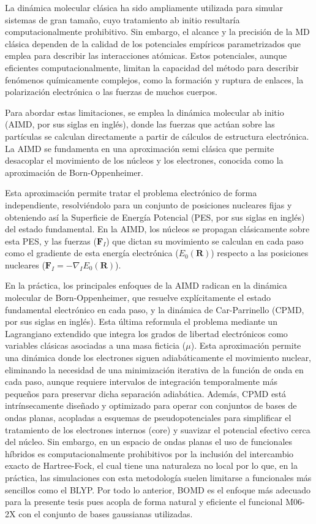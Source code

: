 La dinámica molecular clásica ha sido ampliamente utilizada para simular sistemas de gran tamaño, cuyo tratamiento ab initio resultaría computacionalmente prohibitivo. Sin embargo, el alcance y la precisión de la MD clásica dependen de la calidad de los potenciales empíricos parametrizados que emplea para describir las interacciones atómicas. Estos potenciales, aunque eficientes computacionalmente, limitan la capacidad del método para describir fenómenos químicamente complejos, como la formación y ruptura de enlaces, la polarización electrónica o las fuerzas de muchos cuerpos.

Para abordar estas limitaciones, se emplea la dinámica molecular ab initio (AIMD, por sus siglas en inglés), donde las fuerzas que actúan sobre las partículas se calculan directamente a partir de cálculos de estructura electrónica. La AIMD se fundamenta en una aproximación semi clásica que permite desacoplar el movimiento de los núcleos y los electrones, conocida como la aproximación de Born-Oppenheimer.

Esta aproximación permite tratar el problema electrónico de forma independiente, resolviéndolo para un conjunto de posiciones nucleares fijas y obteniendo así la Superficie de Energía Potencial (PES, por sus siglas en inglés) del estado fundamental. En la AIMD, los núcleos se propagan clásicamente sobre esta PES, y las fuerzas ($\mathbf{F}_I$) que dictan su movimiento se calculan en cada paso como el gradiente de esta energía electrónica ($E_0(\mathbf{R})$) respecto a las posiciones nucleares ($\mathbf{F}_I = -\nabla_I E_0(\mathbf{R})$).

En la práctica, los principales enfoques de la AIMD radican en la dinámica molecular de Born-Oppenheimer, que resuelve explícitamente el estado fundamental electrónico en cada paso, y la dinámica de Car-Parrinello (CPMD, por sus siglas en inglés). Esta última reformula el problema mediante un Lagrangiano extendido que integra los grados de libertad electrónicos como variables clásicas asociadas a una masa ficticia ($\mu$). Esta aproximación permite una dinámica donde los electrones siguen adiabáticamente el movimiento nuclear, eliminando la necesidad de una minimización iterativa de la función de onda en cada paso, aunque requiere intervalos de integración temporalmente más pequeños para preservar dicha separación adiabática. Además, CPMD está intrínsecamente diseñado y optimizado para operar con conjuntos de bases de ondas planas, acopladas a esquemas de pseudopotenciales para simplificar el tratamiento de los electrones internos (core) y suavizar el potencial efectivo cerca del núcleo. Sin embargo, en un espacio de ondas planas el uso de funcionales híbridos es computacionalmente prohibitivos por la inclusión del intercambio exacto de Hartree-Fock, el cual tiene una naturaleza no local por lo que, en la práctica, las simulaciones con esta metodología suelen limitarse a funcionales más sencillos como el BLYP. Por todo lo anterior, BOMD es el enfoque más adecuado para la presente tesis pues acopla de forma natural y eficiente el funcional M06-2X con el conjunto de bases gaussianas utilizadas.

